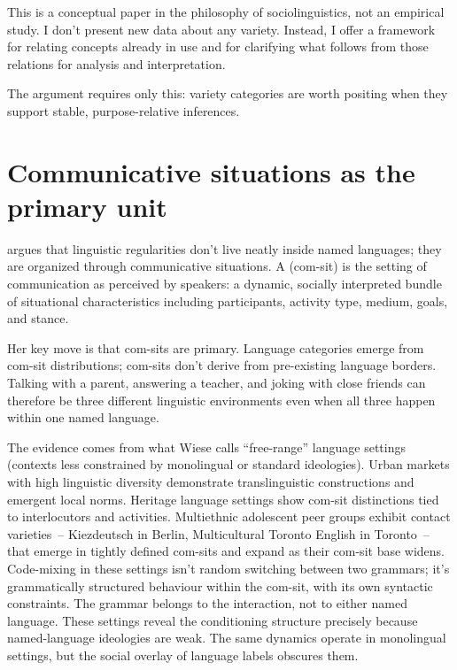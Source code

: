 \documentclass[11pt,letterpaper]{article}
\begin{document}
This is a conceptual paper in the philosophy of sociolinguistics, not an empirical study. I don't present new data about any variety. Instead, I offer a framework for relating concepts already in use and for clarifying what follows from those relations for analysis and interpretation.

The argument requires only this: variety categories are worth positing when they support stable, purpose-relative inferences.

\section{Communicative situations as the primary unit}

\textcite{wiese2023} argues that linguistic regularities don't live neatly inside named languages; they are organized through communicative situations. A  (com-sit) is the setting of communication as perceived by speakers: a dynamic, socially interpreted bundle of situational characteristics including participants, activity type, medium, goals, and stance.

Her key move is that com-sits are primary. Language categories emerge from com-sit distributions; com-sits don't derive from pre-existing language borders. Talking with a parent, answering a teacher, and joking with close friends can therefore be three different linguistic environments even when all three happen within one named language.

The evidence comes from what Wiese calls \enquote{free-range} language settings (contexts less constrained by monolingual or standard ideologies). Urban markets with high linguistic diversity demonstrate translinguistic constructions and emergent local norms. Heritage language settings show com-sit distinctions tied to interlocutors and activities. Multiethnic adolescent peer groups exhibit contact varieties~-- Kiezdeutsch in Berlin, Multicultural Toronto English in Toronto~-- that emerge in tightly defined com-sits and expand as their com-sit base widens. Code-mixing in these settings isn't random switching between two grammars; it's grammatically structured behaviour within the com-sit, with its own syntactic constraints. The grammar belongs to the interaction, not to either named language. These settings reveal the conditioning structure precisely because named-language ideologies are weak. The same dynamics operate in monolingual settings, but the social overlay of language labels obscures them.
\end{document}
